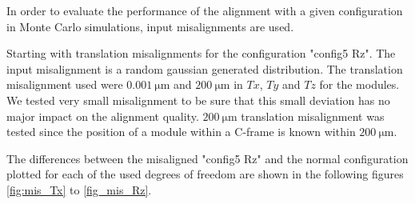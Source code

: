 In order to evaluate the performance of the alignment with a given configuration in Monte Carlo simulations, input misalignments are used.

Starting with translation misalignments for the configuration "config5 Rz". The input misalignment is a random gaussian generated distribution. The translation misalignment used were $\SI{0.001}{\micro\metre}$ and $\SI{200}{\micro\metre}$ in $Tx$, $Ty$ and $Tz$ for the modules. We tested very small misalignment to be sure that this small deviation has no major impact on the alignment quality. $\SI{200}{\micro\metre}$ translation misalignment was tested since the position of a module within a C-frame is known within $\SI{200}{\micro\metre}$.

The differences between the misaligned "config5 Rz" and the normal configuration plotted for each of the used degrees of freedom are shown in the following figures \ref{fig:mis_Tx} to \ref{fig_mis_Rz}.

